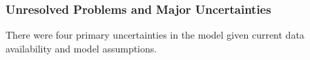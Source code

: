 \documentclass[11pt,
  english,
  a4paper,
]{article}
\begin{document}
\leavevmode\tagmcend\tagstructend\par


\hypertarget{unresolved-problems-and-major-uncertainties}{%
\subsubsection{Unresolved Problems and Major Uncertainties}\label{unresolved-problems-and-major-uncertainties}}

\leavevmode\tagmcend\tagstructend


There were four primary uncertainties in the model given current data availability and model assumptions.

\leavevmode\tagmcend\tagstructend\par

\end{document}
